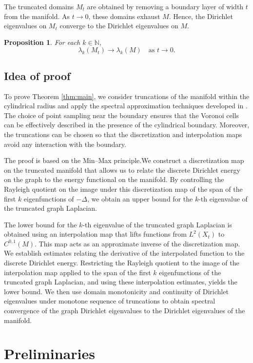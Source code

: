 \documentclass[10 pt, reqno]{amsart}
\newtheorem{proposition}[theorem]{Proposition}
\theoremstyle{definition}
\numberwithin{equation}{section}
\begin{document}
The truncated domains $M_t$ are obtained by removing a boundary layer of width $t$ from the manifold. As $t\to 0$, these domains exhaust $M$. Hence, the Dirichlet eigenvalues on $M_t$  converge to the  Dirichlet eigenvalues on $M.$
\begin{proposition}
\label{proposition}
 For each $k\in\mathbb{N}$,
\[
\lambda_k(M_t)\to\lambda_k(M)
\quad\text{as }t\to0.
\]   
\end{proposition}
\subsection*{Idea of proof}
To prove Theorem \ref{thm:main}, we consider truncations of the manifold within the cylindrical radius and apply the spectral approximation techniques developed in \cite{burago}. The choice of point sampling near the boundary ensures that the Voronoi cells can be effectively described in the presence of the cylindrical boundary. Moreover, the truncations can be chosen so that the discretization and interpolation maps avoid any interaction with the boundary.

The proof  is based on the Min–Max principle.We construct a discretization map on the truncated manifold that allows us to relate the discrete Dirichlet energy on the graph to the energy functional on the manifold. By controlling the Rayleigh quotient on the image under this discretization map of the span of the first $k$ eigenfunctions of $-\Delta$, we obtain an upper bound for the $k$-th eigenvalue of the truncated graph Laplacian.

The lower bound for the $k$-th eigenvalue of the truncated graph Laplacian is obtained using an interpolation map that lifts functions from $L^2(X_t)$ to $C^{0,1}(M)$. This map acts as an approximate inverse of the discretization map. We establish estimates relating the derivative of the interpolated function to the discrete Dirichlet energy. Restricting the Rayleigh quotient to the image of the interpolation map applied to the span of the first $k$ eigenfunctions of the truncated graph Laplacian, and using these interpolation estimates, yields the lower bound.
We then use domain monotonicity and continuity of Dirichlet eigenvalues under monotone sequence of truncations to obtain spectral convergence of the graph Dirichlet eigenvalues to the Dirichlet eigenvalues of the manifold.

\section{Preliminaries}
\end{document}
